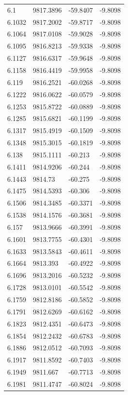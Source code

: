 \begin{table}[H]
\begin{tabular}{llll}
6.1 & 9817.3896 & -59.8407 & -9.8098 \\
6.1032 & 9817.2002 & -59.8717 & -9.8098 \\
6.1064 & 9817.0108 & -59.9028 & -9.8098 \\
6.1095 & 9816.8213 & -59.9338 & -9.8098 \\
6.1127 & 9816.6317 & -59.9648 & -9.8098 \\
6.1158 & 9816.4419 & -59.9958 & -9.8098 \\
6.119 & 9816.2521 & -60.0268 & -9.8098 \\
6.1222 & 9816.0622 & -60.0579 & -9.8098 \\
6.1253 & 9815.8722 & -60.0889 & -9.8098 \\
6.1285 & 9815.6821 & -60.1199 & -9.8098 \\
6.1317 & 9815.4919 & -60.1509 & -9.8098 \\
6.1348 & 9815.3015 & -60.1819 & -9.8098 \\
6.138 & 9815.1111 & -60.213 & -9.8098 \\
6.1411 & 9814.9206 & -60.244 & -9.8098 \\
6.1443 & 9814.73 & -60.275 & -9.8098 \\
6.1475 & 9814.5393 & -60.306 & -9.8098 \\
6.1506 & 9814.3485 & -60.3371 & -9.8098 \\
6.1538 & 9814.1576 & -60.3681 & -9.8098 \\
6.157 & 9813.9666 & -60.3991 & -9.8098 \\
6.1601 & 9813.7755 & -60.4301 & -9.8098 \\
6.1633 & 9813.5843 & -60.4611 & -9.8098 \\
6.1664 & 9813.393 & -60.4922 & -9.8098 \\
6.1696 & 9813.2016 & -60.5232 & -9.8098 \\
6.1728 & 9813.0101 & -60.5542 & -9.8098 \\
6.1759 & 9812.8186 & -60.5852 & -9.8098 \\
6.1791 & 9812.6269 & -60.6162 & -9.8098 \\
6.1823 & 9812.4351 & -60.6473 & -9.8098 \\
6.1854 & 9812.2432 & -60.6783 & -9.8098 \\
6.1886 & 9812.0512 & -60.7093 & -9.8098 \\
6.1917 & 9811.8592 & -60.7403 & -9.8098 \\
6.1949 & 9811.667 & -60.7713 & -9.8098 \\
6.1981 & 9811.4747 & -60.8024 & -9.8098 \\

\end{tabular}
\end{table}
